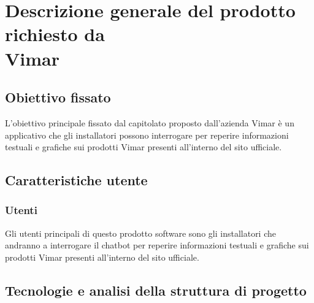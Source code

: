 \section{Descrizione generale del prodotto richiesto da \\ Vimar}
\subsection{Obiettivo fissato}
L'obiettivo principale fissato dal capitolato proposto dall'azienda Vimar è un applicativo che gli installatori possono
interrogare per reperire informazioni testuali e grafiche sui prodotti Vimar presenti all’interno del
sito ufficiale.
\subsection{Caratteristiche utente}
\subsubsection{Utenti}
Gli utenti principali di questo prodotto software sono gli installatori che andranno a interrogare il chatbot per reperire informazioni testuali e grafiche sui prodotti Vimar presenti all'interno del sito ufficiale.
\subsection{Tecnologie  e analisi della struttura di progetto} 
